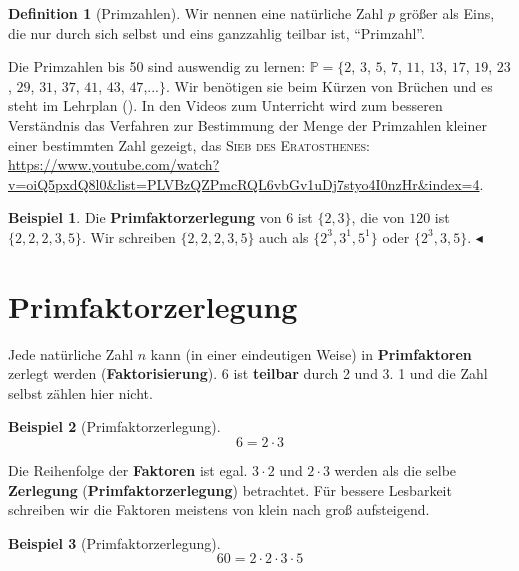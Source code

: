 \documentclass[a4paper]{book}%
\newcommand{\topicend}{
      $\blacktriangleleft$
}
\theoremstyle{definition}
\newtheorem{definition}{Definition}
\newtheorem{beispiel}{Beispiel}
\begin{document}
\begin{definition}[Primzahlen]\label{def:Primzahl}
    Wir nennen eine natürliche Zahl $p$ größer als Eins, die nur durch sich selbst und eins ganzzahlig teilbar ist, \enquote{Primzahl}.
\end{definition}

Die Primzahlen bis 50 sind auswendig zu lernen: $\mathbb{P}=\{2$, $3$, $5$, $7$, $11$, $13$, $17$, $19$, $23$, $29$, $31$, $37$, $41$, $43$, $47$,...$\}$. Wir benötigen sie beim Kürzen von Brüchen und es steht im Lehrplan (\citep[S. 11]{LehrplanMathematikHauptschuleHessen2017}). In den Videos zum Unterricht wird zum besseren Verständnis das Verfahren zur Bestimmung der Menge der Primzahlen kleiner einer bestimmten Zahl gezeigt, das \textsc{Sieb des Eratosthenes}: \url{https://www.youtube.com/watch?v=oiQ5pxdQ8l0&list=PLVBzQZPmcRQL6vbGv1uDj7styo4I0nzHr&index=4}.

\begin{beispiel}
    Die \textbf{Primfaktorzerlegung} von $6$ ist $\{2,3\}$, die von $120$ ist $\{2,2,2,3,5\}$. Wir schreiben $\{2,2,2,3,5\}$ auch als $\{2^3,3^1,5^1\}$ oder $\{2^3,3,5\}$.\topicend
\end{beispiel}


\section{Primfaktorzerlegung}

Jede natürliche Zahl $n$ kann (in einer eindeutigen Weise) in \textbf{Primfaktoren} zerlegt werden (\textbf{Faktorisierung}). 6 ist \textbf{teilbar} durch 2 und 3. 1 und die Zahl selbst zählen hier nicht.

\begin{beispiel}[Primfaktorzerlegung]
    \begin{equation}\label{eqn:primfaktorzerlegung01}
        6 = 2 \cdot 3
    \end{equation}
\end{beispiel}

Die Reihenfolge der \textbf{Faktoren} ist egal. $3 \cdot 2$ und $2 \cdot 3$ werden als die selbe \textbf{Zerlegung} (\textbf{Primfaktorzerlegung}) betrachtet. Für bessere Lesbarkeit schreiben wir die Faktoren meistens von klein nach groß aufsteigend.

\begin{beispiel}[Primfaktorzerlegung]
    \begin{equation}\label{eqn:primfaktorzerlegung02}
        60 = 2 \cdot 2 \cdot 3 \cdot 5
    \end{equation}
\end{beispiel}
\end{document}
